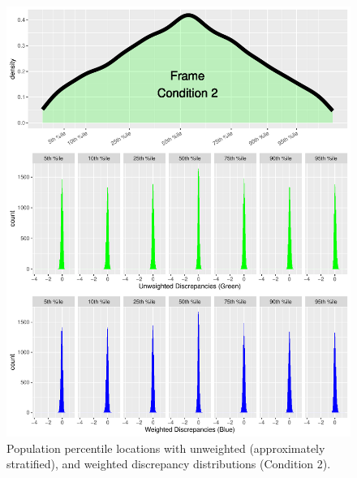 \documentclass[
  ,man]{apa6}
\begin{document}
\begin{figure}
\centering
\includegraphics{NormsBuilding_files/figure-latex/Figure4-1.pdf}
\caption{\label{fig:Figure4}Population percentile locations with unweighted (approximately stratified), and weighted discrepancy distributions (Condition 2).}
\end{figure}
\end{document}
